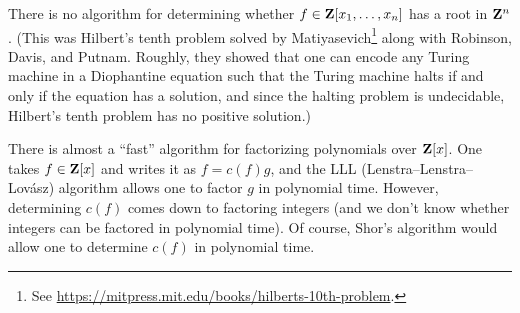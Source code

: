 \documentclass[11pt, oneside,margin=1in]{article}
\begin{document}
There is no algorithm for determining whether $f\in \mathbf Z[x_1,\hdots,x_n]$ has a root in $\mathbf Z^n$. (This was Hilbert's tenth problem solved by Matiyasevich\footnote{See \url{https://mitpress.mit.edu/books/hilberts-10th-problem}.} along with Robinson, Davis, and Putnam. Roughly, they showed that one can encode any Turing machine in a Diophantine equation such that the Turing machine halts if and only if the equation has a solution, and since the halting problem is undecidable, Hilbert's tenth problem has no positive solution.)

There is almost a ``fast'' algorithm for factorizing polynomials over $\mathbf Z[x]$. One takes $f\in \mathbf Z[x]$ and writes it as $f = c(f)g$, and the LLL (Lenstra--Lenstra--Lov\'asz) algorithm allows one to factor $g $ in polynomial time. However, determining $c(f)$ comes down to factoring integers (and we don't know whether integers can be factored in polynomial time). Of course, Shor's algorithm would allow one to determine $c(f)$ in polynomial time.
\end{document}
